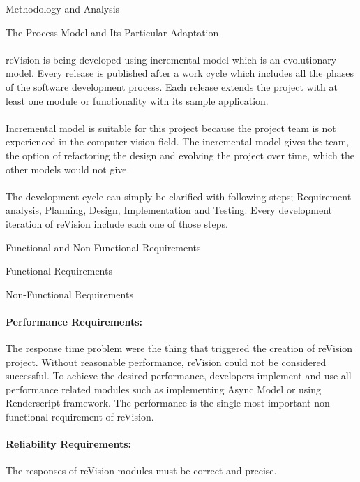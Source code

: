 \documentclass[12pt, a4paper]{article} \pagenumbering{gobble}
\begin{document}
\begin{section}{Methodology and Analysis}
\begin{subsection}{The Process Model and Its Particular Adaptation}
\paragraph{}{reVision is being developed using incremental model which is an evolutionary model. Every release is published after a work cycle which includes all the phases of the software development process. Each release extends the project with at least one module or functionality with its sample application.}
\paragraph{}{Incremental model is suitable for this project because the project team is not experienced in the computer vision field. The incremental model gives the team, the option of refactoring the design and evolving the project over time, which the other models would not give.}
\paragraph{}{The development cycle can simply be clarified with following steps; Requirement analysis, Planning, Design, Implementation and Testing. Every development iteration of reVision include each one of those steps.}
  \end{subsection}
  \newpage
  \begin{subsection}{Functional and Non-Functional Requirements}
    \begin{subsubsection}{Functional Requirements}
    \end{subsubsection}

    \begin{subsubsection}{Non-Functional Requirements}
      \paragraph{Performance Requirements:}{
      The response time problem were the thing that triggered the creation of reVision project. Without reasonable
      performance, reVision could not be considered successful. To achieve the desired performance, developers implement
      and use all performance related modules such as implementing Async Model or using Renderscript framework. The
      performance is the single most important non-functional requirement of reVision.
      }
      ​
      \paragraph{Reliability Requirements:}{
      The responses of reVision modules must be correct and precise.
      }
      ​

\end{subsubsection}
\end{subsection}
\end{section}
\end{document}
